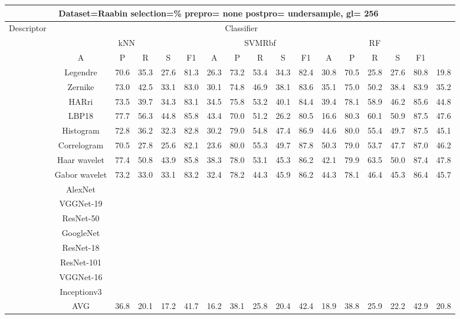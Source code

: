 \documentclass[12pt,italian]{article}
\begin{document}
\begin{tiny}
\begin{longtable}{lcccccccccccccccc}
\toprule
\multicolumn{16}{c}{Dataset=Raabin selection=\% prepro= none postpro= undersample, gl= 256} \\ 
\toprule
Descriptor & \multicolumn{15}{c}{Classifier} \\ 
& \multicolumn{5}{c}{kNN} & \multicolumn{5}{c}{SVMRbf} & \multicolumn{5}{c}{RF} \\ 
& A & P & R & S & F1 & A & P & R & S & F1 & A & P & R & S & F1 \\ 
\midrule
& Legendre & 70.6 & 35.3 & 27.6 & 81.3 & 26.3 & 73.2 & 53.4 & 34.3 & 82.4 & 30.8 & 70.5 & 25.8 & 27.6 & 80.8 & 19.8 \\ 
& Zernike & 73.0 & 42.5 & 33.1 & 83.0 & 30.1 & 74.8 & 46.9 & 38.1 & 83.6 & 35.1 & 75.0 & 50.2 & 38.4 & 83.9 & 35.2 \\ 
& HARri & 73.5 & 39.7 & 34.3 & 83.1 & 34.5 & 75.8 & 53.2 & 40.1 & 84.4 & 39.4 & 78.1 & 58.9 & 46.2 & 85.6 & 44.8 \\ 
& LBP18 & 77.7 & 56.3 & 44.8 & 85.8 & 43.4 & 70.0 & 51.2 & 26.2 & 80.5 & 16.6 & 80.3 & 60.1 & 50.9 & 87.5 & 47.6 \\ 
& Histogram & 72.8 & 36.2 & 32.3 & 82.8 & 30.2 & 79.0 & 54.8 & 47.4 & 86.9 & 44.6 & 80.0 & 55.4 & 49.7 & 87.5 & 45.1 \\ 
& Correlogram & 70.5 & 27.8 & 25.6 & 82.1 & 23.6 & 80.0 & 55.3 & 49.7 & 87.8 & 50.3 & 79.0 & 53.7 & 47.7 & 87.0 & 46.2 \\ 
& Haar wavelet & 77.4 & 50.8 & 43.9 & 85.8 & 38.3 & 78.0 & 53.1 & 45.3 & 86.2 & 42.1 & 79.9 & 63.5 & 50.0 & 87.4 & 47.8 \\ 
& Gabor wavelet & 73.2 & 33.0 & 33.1 & 83.2 & 32.4 & 78.2 & 44.3 & 45.9 & 86.2 & 44.3 & 78.1 & 46.4 & 45.3 & 86.4 & 45.7 \\ 
& AlexNet \\ 
& VGGNet-19 \\ 
& ResNet-50 \\ 
& GoogleNet \\ 
& ResNet-18 \\ 
& ResNet-101 \\ 
& VGGNet-16 \\ 
& Inceptionv3 \\ 
\hline
& AVG & 36.8 & 20.1 & 17.2 & 41.7 & 16.2 & 38.1 & 25.8 & 20.4 & 42.4 & 18.9 & 38.8 & 25.9 & 22.2 & 42.9 & 20.8 \\ 
\hline
\bottomrule
\end{longtable} 


\end{tiny}
\end{document}
